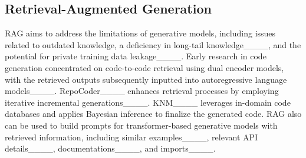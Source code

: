 \subsection{Retrieval-Augmented Generation}



RAG aims to address the limitations of generative models, including issues related to outdated knowledge, a deficiency in long-tail knowledge____, and the potential for private training data leakage____.
Early research in code generation concentrated on code-to-code retrieval using dual encoder models, with the retrieved outputs subsequently inputted into autoregressive language models____. 
RepoCoder____ enhances retrieval processes by employing iterative incremental generations____.
KNM____ leverages in-domain code databases and applies Bayesian inference to finalize the generated code.
RAG also can be used to build prompts for transformer-based generative models with retrieved information, including similar examples____, relevant API details____, documentations____, and imports____.